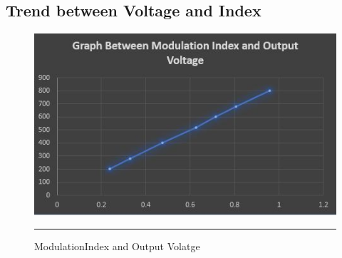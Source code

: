 \subsection{Trend between Voltage and Index}
\begin{figure}[htbp]
	\centering
	\includegraphics[width = 6in]{./Figures/mod.JPG}
	\rule{35em}{1pt}
	\caption{ModulationIndex and Output Volatge}
\end{figure}
\newpage
